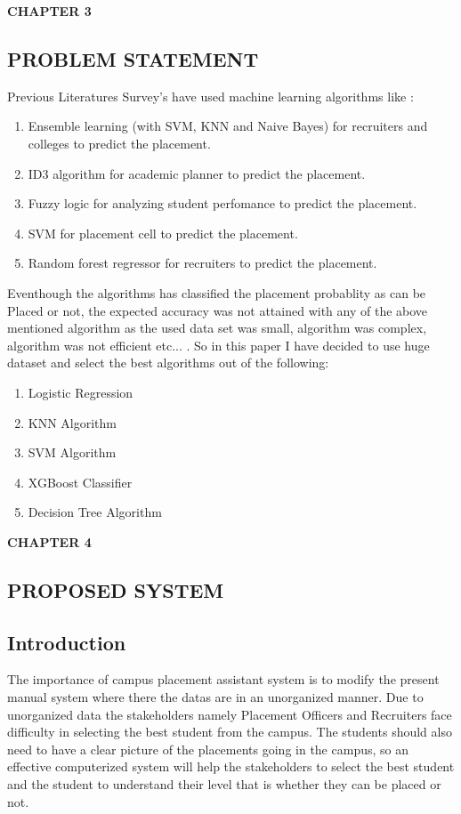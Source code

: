 \documentclass[12pt]{article}
\begin{document}
\begin{flushleft}\textbf{CHAPTER 3} \end{flushleft}
\begin{flushleft}\section{PROBLEM STATEMENT} \end{flushleft}
Previous Literatures Survey's have used machine learning algorithms like :
\begin{enumerate}
\item Ensemble learning (with SVM, KNN and Naive Bayes) for recruiters and colleges to predict the placement.
\item ID3 algorithm for academic planner to predict the placement.
\item Fuzzy logic for analyzing student perfomance to predict the placement.
\item SVM for placement cell to predict the placement.
\item Random forest regressor for recruiters to predict the placement.
\end{enumerate}
Eventhough the algorithms has classified the placement probablity as can be Placed or not, the expected accuracy was not attained with any of the above mentioned algorithm as the used data set was small, algorithm was complex, algorithm was not efficient etc... . 
So in this paper I have decided to use huge dataset and select the best algorithms out of the following:
\begin{enumerate}
\item Logistic Regression
\item KNN Algorithm
\item SVM Algorithm
\item XGBoost Classifier
\item Decision Tree Algorithm
\end{enumerate}
\newpage
\begin{flushleft}\textbf{CHAPTER 4} \end{flushleft}
\begin{flushleft}\section{PROPOSED SYSTEM} \end{flushleft}
\subsection{Introduction}
The importance of campus placement assistant system is to modify the present 
manual system where there the datas are in an unorganized manner. Due to unorganized data the stakeholders namely Placement Officers and Recruiters face difficulty in selecting the best student from the campus. The students should also need to have a clear picture of the placements going in the campus, so an effective computerized system will help the stakeholders to select the best student and the student to understand their level that is whether they can be placed or not.
\end{document}
